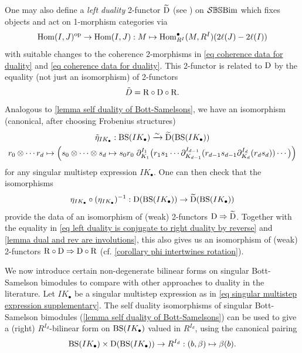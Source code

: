 \begin{remark}\label{rmk left duals and right duals are naturally isomorphic}
    One may also define a \emph{left duality} 2-functor $\widetilde{\mathrm{D}}$ (see \cite[Remark 3.10]{BBE}) on $\mathcal{S}\mathbb{BS}\text{Bim}$ which fixes objects and act on 1-morphism categories via
    \begin{equation}
    \operatorname{Hom}(I,J)^{\operatorname{op}}\to \operatorname{Hom}(I,J): M \mapsto \operatorname{Hom}^\bullet_{R^I}(M, R^I)(2\ell(J)-2\ell(I))
    \end{equation}
    with suitable changes to the coherence 2-morphisms in \cref{eq coherence data for duality} and \cref{eq coherence data for duality}.
    This 2-functor is related to $\mathrm{D}$ by the equality (not just an isomorphism) of 2-functors
    \begin{equation}\label{eq left duality is conjugate to right duality by reverse}
        \tilde{D}=\mathrm{R} \circ \mathrm{D} \circ \mathrm{R}.
    \end{equation}
    Analogous to \cref{lemma self duality of Bott-Samelsons}, we have an isomorphism (canonical, after choosing Frobenius structures)
    \begin{gather}
        \notag \tilde{\eta}_{IK_\bullet}: \operatorname{BS}(IK_\bullet) \xrightarrow{\sim} \widetilde{\mathrm{D}}(\operatorname{BS}(IK_\bullet)) \\
        r_0\otimes \cdots r_d \mapsto \Bigl(s_0 \otimes \cdots \otimes s_d \mapsto s_0r_0 \;\partial^{I_1}_{K_1}\bigl(r_1s_1\cdots \partial^{I_{d-1}}_{K_{d-1}}(r_{d-1}s_{d-1}\partial^{I_d}_{K_d}(r_d s_d)) \cdots \bigr)\Bigr) \label{eq self duality of Bott Samelsons for left dual}
    \end{gather}
    for any singular multistep expression $IK_\bullet$.
    One can then check that the isomorphisms 
    \begin{equation}
    \eta_{IK_\bullet} \circ (\eta_{IK_\bullet})^{-1}: \mathrm{D}(\operatorname{BS}(IK_\bullet)) \rightarrow \widetilde{\mathrm{D}}(\operatorname{BS}(IK_\bullet))\end{equation}
    provide the data of an isomorphism of (weak) 2-functors $\mathrm{D} \Rightarrow \widetilde{\mathrm{D}}$.
   Together with the equality in \cref{eq left duality is conjugate to right duality by reverse} and \cref{lemma dual and rev are involutions}, this also gives us an isomorphism of (weak) 2-functors $\mathrm{R} \circ \mathrm{D} \Rightarrow \mathrm{D} \circ \mathrm{R}$ (cf. \cref{corollary phi intertwines rotation}). 
\end{remark}

We now introduce certain non-degenerate bilinear forms on singular Bott-Samelson bimodules to compare with other approaches to duality in the literature.
Let $IK_\bullet$ be a singular multistep expression as in \cref{eq singular multistep expression supplementary}.
The self duality isomorphisms of singular Bott-Samelson bimodules (\cref{lemma self duality of Bott-Samelsons}) can be used to give a (right) $R^{I_d}$-bilinear form on $\operatorname{BS}(IK_\bullet)$ valued in $R^{I_d}$, using the canonical pairing
\begin{equation}
    \operatorname{BS}(IK_\bullet) \times \mathrm{D}(\operatorname{BS}(IK_\bullet)) \rightarrow R^{I_d}: (b, \beta)\mapsto \beta(b).
\end{equation}


